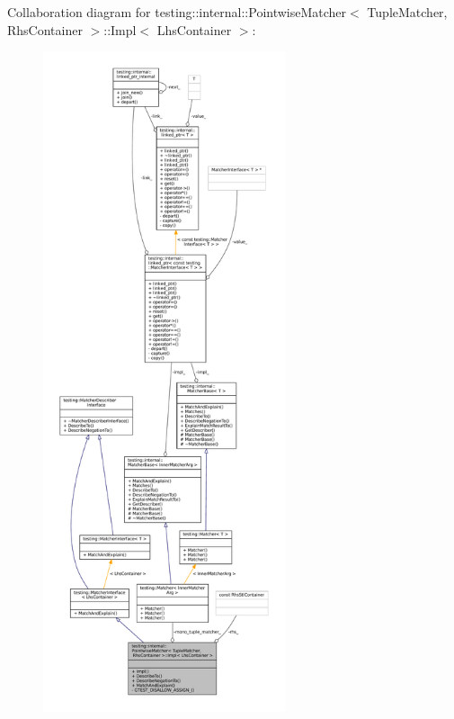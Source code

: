 Collaboration diagram for testing\+:\+:internal\+:\+:Pointwise\+Matcher$<$ Tuple\+Matcher, Rhs\+Container $>$\+:\+:Impl$<$ Lhs\+Container $>$\+:
\nopagebreak
\begin{figure}[H]
\begin{center}
\leavevmode
\includegraphics[height=550pt]{classtesting_1_1internal_1_1PointwiseMatcher_1_1Impl__coll__graph}
\end{center}
\end{figure}
